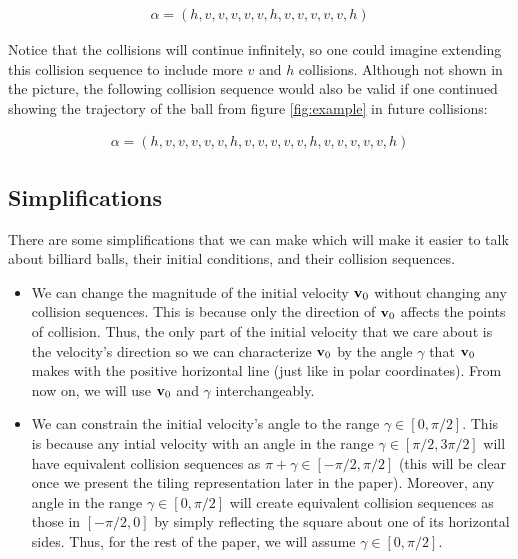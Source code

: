 \begin{eqnarray}
  \alpha = ( h, v, v, v, v, v, h, v, v, v, v, v, h)
\end{eqnarray}

Notice that the collisions will continue infinitely, so one could imagine extending this collision sequence to include more $v$ and $h$ collisions. Although not shown in the picture, the following collision sequence would also be valid if one continued showing the trajectory of the ball from figure \ref{fig:example} in future collisions:

\begin{eqnarray}
  \alpha = (h, v, v, v, v, v, h, v, v, v, v, v, h, v, v, v, v, v, h)
\end{eqnarray}

\subsection{Simplifications}

There are some simplifications that we can make which will make it easier to talk about billiard balls, their initial conditions, and their collision sequences.

\begin{itemize}
  \item We can change the magnitude of the initial velocity $\mathbf{v}_0$ without changing any collision sequences. This is because only the direction of $\mathbf{v}_0$ affects the points of collision. Thus, the only part of the initial velocity that we care about is the velocity's direction so we can characterize $\mathbf{v}_0$ by the angle $\gamma$ that $\mathbf{v}_0$ makes with the positive horizontal line (just like in polar coordinates). From now on, we will use $\mathbf{v}_0$ and $\gamma$ interchangeably.
  \item We can constrain the initial velocity's angle to the range $\gamma \in [0, \pi/2]$. This is because any intial velocity with an angle in the range $\gamma \in [\pi/2, 3\pi/2]$ will have equivalent collision sequences as $\pi + \gamma \in [-\pi/2, \pi/2]$ (this will be clear once we present the tiling representation later in the paper). Moreover, any angle in the range $\gamma \in [0, \pi/2]$ will create equivalent collision sequences as those in $[-\pi/2, 0]$ by simply reflecting the square about one of its horizontal sides. Thus, for the rest of the paper, we will assume $\gamma \in [0, \pi/2]$.
\end{itemize}
